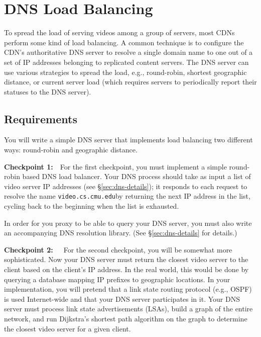 \documentclass{article}
\newcommand{\theurl}{\texttt{video.cs.cmu.edu}}
\begin{document}
\section{DNS Load Balancing}
\label{sec:dns}

To spread the load of serving videos among a group of servers, most CDNs
perform some kind of load balancing. A common technique is to configure the
CDN's authoritative DNS server to resolve a single domain name to one out of a
set of IP addresses belonging to replicated content servers. The DNS server can
use various strategies to spread the load, e.g., round-robin, shortest
geographic distance, or current server load (which requires servers to
periodically report their statuses to the DNS server).

\subsection{Requirements}

You will write a simple DNS server that implements load balancing two different
ways: round-robin and geographic distance.

\bigskip \noindent \textbf{Checkpoint 1:}~~For the first checkpoint, you must
implement a simple round-robin based DNS load balancer. Your DNS process should
take as input a list of video server IP addresses (see \S\ref{sec:dns-details});
it responds to each request to resolve the name \theurl by returning the next
IP address in the list, cycling back to the beginning when the list is
exhausted.

In order for you proxy to be able to query your DNS server, you must also write
an accompanying DNS resolution library. (See \S\ref{sec:dns-details} for
details.)



\bigskip \noindent \textbf{Checkpoint 2:}~~~For the second checkpoint, you will
be somewhat more sophisticated. Now your DNS server must return the closest
video server to the client based on the client's IP address. In the real world,
this would be done by querying a database mapping IP prefixes to geographic
locations. In your implementation, you will pretend that a link state routing
protocol (e.g., OSPF) is used Internet-wide and that your DNS server
participates in it. Your DNS server must process link state advertisements
(LSAs), build a graph of the entire network, and run Dijkstra's shortest path
algorithm on the graph to determine the closest video server for a given
client.
\end{document}
